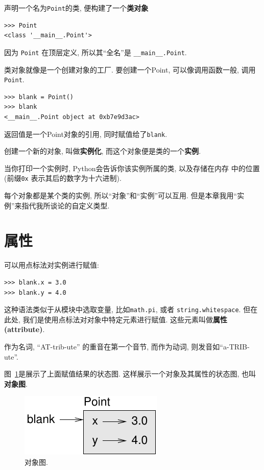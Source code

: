 \documentclass[10pt]{book}
\begin{document}
声明一个名为{\tt Point}的类, 便构建了一个{\bf 类对象}

\begin{verbatim}
>>> Point
<class '__main__.Point'>
\end{verbatim}
%
因为 {\tt Point} 在顶层定义, 所以其``全名''是 \verb"__main__.Point".

类对象就像是一个创建对象的工厂. 
要创建一个Point,  可以像调用函数一般, 调用{\tt Point}.

\begin{verbatim}
>>> blank = Point()
>>> blank
<__main__.Point object at 0xb7e9d3ac>
\end{verbatim}
%
返回值是一个Point对象的引用, 同时赋值给了{\tt blank}.  

创建一个新的对象, 叫做{\bf 实例化}, 
而这个对象便是类的一个{\bf 实例}. 

当你打印一个实例时, Python会告诉你该实例所属的类, 以及存储在内存
中的位置(前缀{\tt 0x} 表示其后的数字为十六进制).

每个对象都是某个类的实例, 所以``对象''和``实例''可以互用. 
但是本章我用``实例''来指代我所谈论的自定义类型. 


\section{属性}
\label{attributes}
可以用点标法对实例进行赋值:

\begin{verbatim}
>>> blank.x = 3.0
>>> blank.y = 4.0
\end{verbatim}
%

这种语法类似于从模块中选取变量, 比如{\tt math.pi}, 或者 {\tt string.whitespace}. 
但在此处, 我们是使用点标法对对象中特定元素进行赋值. 
这些元素叫做{\bf 属性(attribute)}. 

作为名词, ``AT-trib-ute'' 的重音在第一个音节, 而作为动词,  则发音如``a-TRIB-ute''. 

图~\ref{fig.point}是展示了上面赋值结果的状态图. 
这样展示一个对象及其属性的状态图, 也叫{\bf 对象图}. 

\begin{figure}
\centerline
{\includegraphics[scale=0.8]{figs/point.pdf}}
\caption{对象图.}
\label{fig.point}
\end{figure}
\end{document}
